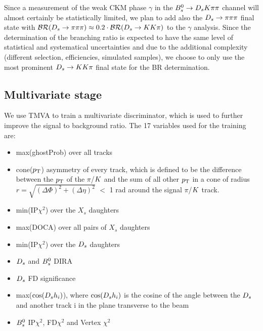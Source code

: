 Since a measurement of the weak CKM phase $\gamma$ in the ${{B}^0_{s}}\rightarrow{\ensuremath{{D}_{s}}}{\ensuremath{K}}{\ensuremath{\pi}}{\ensuremath{\pi}}$ channel will almost certainly be statistically limited, 
we plan to add also the ${{D}_{s}}\rightarrow{\ensuremath{\pi}}{\ensuremath{\pi}}{\ensuremath{\pi}}$ final state with $\mathcal{BR}({{D}_{s}}\rightarrow{\ensuremath{\pi}}{\ensuremath{\pi}}{\ensuremath{\pi}}) \approx 0.2\cdot\mathcal{BR}({{D}_{s}}\rightarrow{\ensuremath{K}}{\ensuremath{K}}{\ensuremath{\pi}})$ to the $\gamma$ analysis. 
Since the determination of the branching ratio is expected to have the same level of statistical and systematical uncertainties and due to the additional complexity (different selection, efficiencies, simulated samples), 
we choose to only use the most prominent ${{D}_{s}}\rightarrow{\ensuremath{K}}{\ensuremath{K}}{\ensuremath{\pi}}$ final state for the BR determination. 


\subsection{Multivariate stage}

We use TMVA \cite{Hocker:2007ht} to train a multivariate discriminator, which is used to further improve the signal to background ratio. 
The 17 variables used for the training are:

\begin{itemize} 

\item max(ghostProb) over all tracks

\item cone($\mbox{$p_{\mathrm{ T}}$}$) asymmetry of every track, 
which is defined to be the difference between the $\mbox{$p_{\mathrm{ T}}$}$ of the $\pi$/${K}$ and the sum of all other $\mbox{$p_{\mathrm{ T}}$}$ in a cone of radius $r = \sqrt{(\Delta\Phi)^{2} + (\Delta\eta)^{2}}$ $<$ 1 rad around the signal $\pi$/${K}$ track.

\item min(IP$\chi^{2}$) over the $X_{s}$ daughters

\item max(DOCA) over all pairs of $X_{s}$ daughters

\item min(IP$\chi^{2}$) over the ${{D}_{s}}$ daughters

\item ${{D}_{s}}$ and ${{B}^0_{s}}$ DIRA

\item ${{D}_{s}}$ FD significance

\item max($\cos({{D}_{s}} h_{i})$), where $\cos({{D}_{s}} h_{i})$ is the cosine of the angle between the ${{D}_{s}}$ and another track i in the plane transverse to the beam

\item ${{B}^0_{s}}$ IP$\chi^{2}$, FD$\chi^{2}$ and Vertex $\chi^{2}$

\end{itemize}

